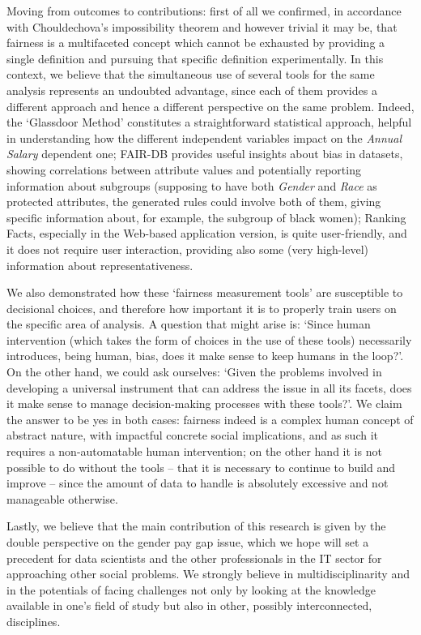 Moving from outcomes to contributions: first of all we confirmed, in accordance with Chouldechova's impossibility theorem \cite{chouldechova2017fair} and however trivial it may be, that fairness is a multifaceted concept which cannot be exhausted by providing a single definition and pursuing that specific definition experimentally. In this context, we believe that the simultaneous use of several tools for the same analysis represents an undoubted advantage, since each of them provides a different approach and hence a different perspective on the same problem. Indeed, the `Glassdoor Method' constitutes a straightforward statistical approach, helpful in understanding how the different independent variables impact on the \textit{Annual Salary} dependent one; FAIR-DB provides useful insights about bias in datasets, showing correlations between attribute values and potentially reporting information about subgroups (supposing to have both \textit{Gender} and \textit{Race} as protected attributes, the generated rules could involve both of them, giving specific information about, for example, the subgroup of black women); Ranking Facts, especially in the Web-based application version, is quite user-friendly, and it does not require user interaction, providing also some (very high-level) information about representativeness.

We also demonstrated how these `fairness measurement tools' are susceptible to decisional choices, and therefore how important it is to properly train users on the specific area of analysis. A question that might arise is: `Since human intervention (which takes the form of choices in the use of these tools) necessarily introduces, being human, bias, does it make sense to keep humans in the loop?'. On the other hand, we could ask ourselves: `Given the problems involved in developing a universal instrument that can address the issue in all its facets, does it make sense to manage decision-making processes with these tools?'. We claim the answer to be yes in both cases: fairness indeed is a complex human concept of abstract nature, with impactful concrete social implications, and as such it requires a non-automatable human intervention; on the other hand it is not possible to do without the tools -- that it is necessary to continue to build and improve -- since the amount of data to handle is absolutely excessive and not manageable otherwise.

Lastly, we believe that the main contribution of this research is given by the double perspective on the gender pay gap issue, which we hope will set a precedent for data scientists and the other professionals in the IT sector for approaching other social problems. We strongly believe in multidisciplinarity and in the potentials of facing challenges not only by looking at the knowledge available in one's field of study but also in other, possibly interconnected, disciplines.


